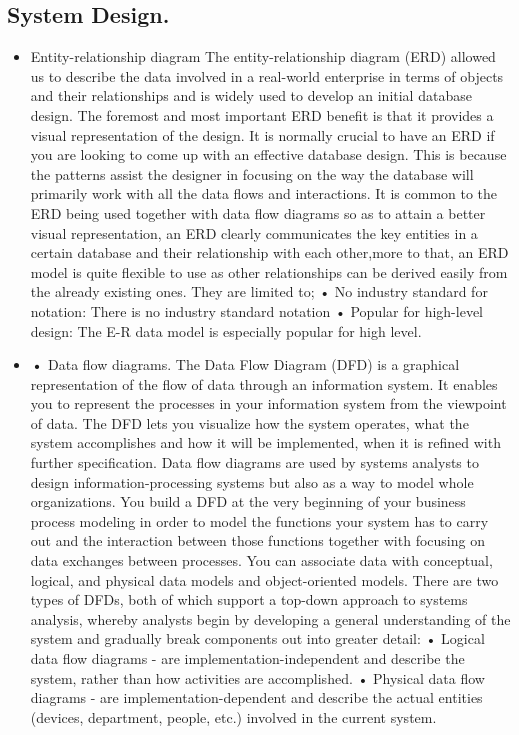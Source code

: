 \documentclass[11pt]{article}
\begin{document}
\subsection*{System Design.}
\begin{itemize}
  \item Entity-relationship diagram
The entity-relationship diagram (ERD) allowed  us to describe the data involved in a real-world enterprise in terms of objects and their relationships and is widely used to develop an initial database design.
The foremost and most important ERD benefit is that it provides a visual representation of the design. It is normally crucial to have an ERD if you are looking to come up with an effective database design. This is because the patterns assist the designer in focusing on the way the database will primarily work with all the data flows and interactions. It is common to the ERD being used together with data flow diagrams so as to attain a better visual representation, an ERD clearly communicates the key entities in a certain database and their relationship with each other,more to that, an ERD model is quite flexible to use as other relationships can be derived easily from the already existing ones. 
 They are limited to;
•	No industry standard for notation: There is no industry standard notation \cite{kiers2000towards}     
•	Popular for high-level design: The E-R data model is especially popular for high level.

  \item\textbf{•} Data flow diagrams.
The Data Flow Diagram (DFD) is a graphical representation of the flow of data through an information system. It enables you to represent the processes in your information system from the viewpoint of data. The DFD lets you visualize how the system operates, what the system accomplishes and how it will be implemented, when it is refined with further specification.
Data flow diagrams are used by systems analysts to design information-processing systems but also as a way to model whole organizations. You build a DFD at the very beginning of your business process modeling in order to model the functions your system has to carry out and the interaction between those functions together with focusing on data exchanges between processes. You can associate data with conceptual, logical, and physical data models and object-oriented models.
There are two types of DFDs, both of which support a top-down approach to systems analysis, whereby analysts begin by developing a general understanding of the system and gradually break components out into greater detail:
•	Logical data flow diagrams - are implementation-independent and describe the system, rather than how activities are accomplished.
•	Physical data flow diagrams - are implementation-dependent and describe the actual entities (devices, department, people, etc.) involved in the current system.
\end{itemize}
\end{document}
